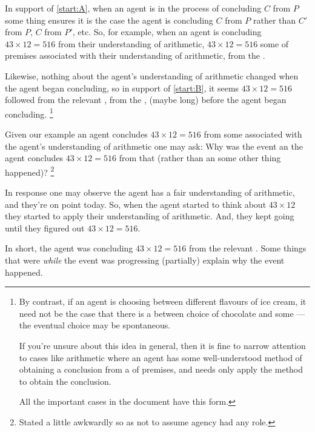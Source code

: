 \begin{note}
  In support of \ref{start:A}, when an agent is in the process of concluding \(C\) from \(P\) some thing ensures it is the case the agent is concluding \(C\) from \(P\) rather than \(C'\) from \(P\), \(C\) from \(P'\), etc.
  So, for example, when an agent is concluding \(43 \times 12 = 516\) from their understanding of arithmetic, \(43 \times 12 = 516\) \fof{} some \pool{} of premises associated with their understanding of arithmetic, from the \agpe{}.

  Likewise, nothing about the agent's understanding of arithmetic changed when the agent began concluding, so in support of \ref{start:B}, it seems \(43 \times 12  = 516\) followed from the relevant \pool{}, from the \agpe{}, (maybe long) before the agent began concluding.%
  \footnote{
    By contrast, if an agent is choosing between different flavours of ice cream, it need not be the case that there is a \fingfr{} between choice of chocolate and some \pool{} --- the eventual choice may be spontaneous.

    If you're unsure about this idea in general, then it is fine to narrow attention to cases like arithmetic where an agent has some well-understood method of obtaining a conclusion from a \pool{} of premises, and needs only apply the method to obtain the conclusion.

    All the important cases in the document have this form.
  }
\end{note}


\begin{note}
  Given our example \eiw{} an agent concludes \(43 \times 12 = 516\) from some \pool{} associated with the agent's understanding of arithmetic one may ask:
  Why was the event an \eiw{} the agent concludes \(43 \times 12 = 516\) from that \pool{} (rather than an \eiw{} some other thing happened)?%
  \footnote{
    Stated a little awkwardly so as not to assume agency had any role.
  }

  In response one may observe the agent has a fair understanding of arithmetic, and they're on point today.
  So, when the agent started to think about \(43 \times 12\) they started to apply their understanding of arithmetic.
  And, they kept going until they figured out \(43 \times 12 = 516\).

  In short, the agent was concluding \(43 \times 12 = 516\) from the relevant \pool{}.
  Some things that were \emph{while} the event was progressing (partially) explain why the event happened.
\end{note}


